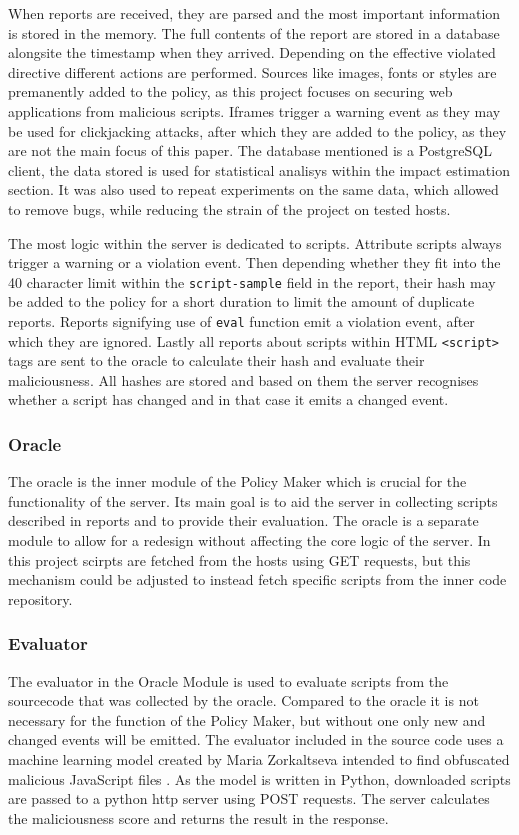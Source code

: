\begin{description}
\begin{description}
When reports are received, they are parsed and the most important information is stored in the memory.
The full contents of the report are stored in a database alongsite the timestamp when they arrived.
Depending on the effective violated directive different actions are performed.
Sources like images, fonts or styles are premanently added to the policy, as this project focuses on securing web applications from malicious scripts.
Iframes trigger a warning event as they may be used for clickjacking attacks, after which they are added to the policy, as they are not the main focus of this paper.
The database mentioned is a PostgreSQL client, the data stored is used for statistical analisys within the impact estimation section.
It was also used to repeat experiments on the same data, which allowed to remove bugs, while reducing the strain of the project on tested hosts.

The most logic within the server is dedicated to scripts.
Attribute scripts always trigger a warning or a violation event.
Then depending whether they fit into the 40 character limit within the \texttt{script-sample} field in the report, their hash may be added to the policy for a short duration to limit the amount of duplicate reports.
Reports signifying use of \texttt{eval} function emit a violation event, after which they are ignored.
Lastly all reports about scripts within HTML \texttt{<script>} tags are sent to the oracle to calculate their hash and evaluate their maliciousness.
All hashes are stored and based on them the server recognises whether a script has changed and in that case it emits a changed event.

\subsubsection{Oracle}
The oracle is the inner module of the Policy Maker which is crucial for the functionality of the server.
Its main goal is to aid the server in collecting scripts described in reports and to provide their evaluation.
The oracle is a separate module to allow for a redesign without affecting the core logic of the server.
In this project scirpts are fetched from the hosts using GET requests, but this mechanism could be adjusted to instead fetch specific scripts from the inner code repository.

\subsubsection{Evaluator}
The evaluator in the Oracle Module is used to evaluate scripts from the sourcecode that was collected by the oracle.
Compared to the oracle it is not necessary for the function of the Policy Maker, but without one only new and changed events will be emitted.
The evaluator included in the source code uses a machine learning model created by Maria Zorkaltseva intended to find obfuscated malicious JavaScript files \cite{evaluator}.
As the model is written in Python, downloaded scripts are passed to a python http server using POST requests.
The server calculates the maliciousness score and returns the result in the response.


\end{description}
\end{description}
